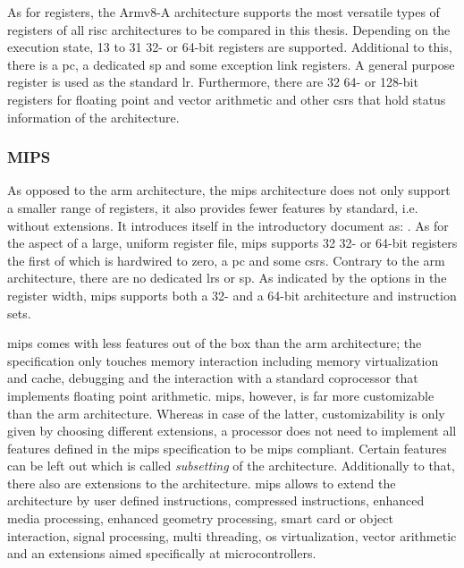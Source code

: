As for registers, the Armv8-A architecture supports the most versatile types of registers of all \gls{risc} architectures to be compared in this thesis.
Depending on the execution state, 13 to 31 32- or 64-bit registers are supported.
Additional to this, there is a \gls{pc}, a dedicated \gls{sp} and some exception link registers.
A general purpose register is used as the standard \gls{lr}.
Furthermore, there are 32 64- or 128-bit registers for floating point and vector arithmetic and other \glspl{csr} that hold status information of the architecture.

\subsubsection{MIPS}

As opposed to the \gls{arm} architecture, the \gls{mips} architecture does not only support a smaller range of registers, it also provides fewer features by standard, i.e. without extensions.
It introduces itself in the introductory document  \cite{MIPS} as: .
As for the aspect of a large, uniform register file, \gls{mips} supports 32 32- or 64-bit registers the first of which is hardwired to zero, a \gls{pc} and some \glspl{csr}.
Contrary to the \gls{arm} architecture, there are no dedicated \glspl{lr} or \gls{sp}.
As indicated by the options in the register width, \gls{mips} supports both a 32- and a 64-bit architecture and instruction sets.

\gls{mips} comes with less features out of the box than the \gls{arm} architecture; the specification only touches memory interaction including memory virtualization and cache, debugging and the interaction with a standard coprocessor that implements floating point arithmetic.
\gls{mips}, however, is far more customizable than the \gls{arm} architecture.
Whereas in case of the latter, customizability is only given by choosing different extensions, a processor does not need to implement all features defined in the \gls{mips} specification to be \gls{mips} compliant.
Certain features can be left out which is called \textit{subsetting} of the architecture.
Additionally to that, there also are extensions to the architecture.
\gls{mips} allows to extend the architecture by user defined instructions, compressed instructions, enhanced media processing, enhanced geometry processing, smart card or object interaction, signal processing, multi threading, \gls{os} virtualization, vector arithmetic and an extensions aimed specifically at microcontrollers.

